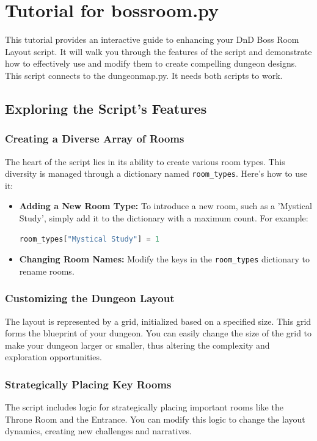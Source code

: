 \documentclass[10pt,twocolumn]{article}
\begin{document}
\section{Tutorial for bossroom.py}
This tutorial provides an interactive guide to enhancing your DnD Boss Room Layout script. It will walk you through the features of the script and demonstrate how to effectively use and modify them to create compelling dungeon designs. This script connects to the dungeonmap.py. It needs both scripts to work.

\subsection{Exploring the Script's Features}
\subsubsection{Creating a Diverse Array of Rooms}
The heart of the script lies in its ability to create various room types. This diversity is managed through a dictionary named \texttt{room\_types}. Here's how to use it:

\begin{itemize}
    \item \textbf{Adding a New Room Type:} To introduce a new room, such as a 'Mystical Study', simply add it to the dictionary with a maximum count. For example:
    \begin{lstlisting}[language=Python]
    room_types["Mystical Study"] = 1
    \end{lstlisting}

    \item \textbf{Changing Room Names:} Modify the keys in the \texttt{room\_types} dictionary to rename rooms.
\end{itemize}

\subsubsection{Customizing the Dungeon Layout}
The layout is represented by a grid, initialized based on a specified size. This grid forms the blueprint of your dungeon. You can easily change the size of the grid to make your dungeon larger or smaller, thus altering the complexity and exploration opportunities.

\subsubsection{Strategically Placing Key Rooms}
The script includes logic for strategically placing important rooms like the Throne Room and the Entrance. You can modify this logic to change the layout dynamics, creating new challenges and narratives.
\end{document}
